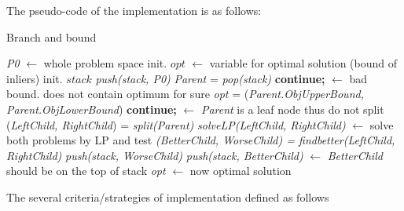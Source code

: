 \documentclass[paper=a4, fontsize=11pt]{scrartcl} %
\numberwithin{equation}{section} %
\numberwithin{figure}{section} %
\numberwithin{table}{section} %
\begin{document}
The pseudo-code of the implementation is as follows: 

\begin{algorithm}
\caption{Branch and bound}\label{euclid}
\begin{algorithmic}[1]
\State \textit{P0} $\gets$ whole problem space
\State init. $\textit{opt}$ $\gets$ variable for optimal solution (bound of inliers)
\State init. $\textit{stack}$ 
\State \textit{push(stack, P0)}
\State 
{}
	\State \textit{Parent} = \textit{pop(stack)}
		\State \textbf{continue;} $\gets$ bad bound. does not contain optimum for sure
	\EndIf
	\State
        		\State \textit{opt} = (\textit{Parent.ObjUpperBound, Parent.ObjLowerBound})
        \EndIf
        	\State
        		\State \textbf{continue;} $\gets$ \textit{Parent} is a leaf node thus do not split
        \EndIf
        \State
        \State (\textit{LeftChild, RightChild}) = \textit{split(Parent)}
        \State \textit{solveLP(LeftChild, RightChild)} $\gets$ solve both problems by LP and test
	\State
	\State \textit{(BetterChild, WorseChild) = findbetter(LeftChild, RightChild)}
	\State \textit{push(stack, WorseChild)}	
	\State \textit{push(stack, BetterChild)} $\gets$ \textit{BetterChild} should be on the top of stack
\EndWhile
\State
\State \textit{opt} $\gets$ now optimal solution  
\end{algorithmic}
\end{algorithm}

The several criteria/strategies of implementation defined as follows
\end{document}

